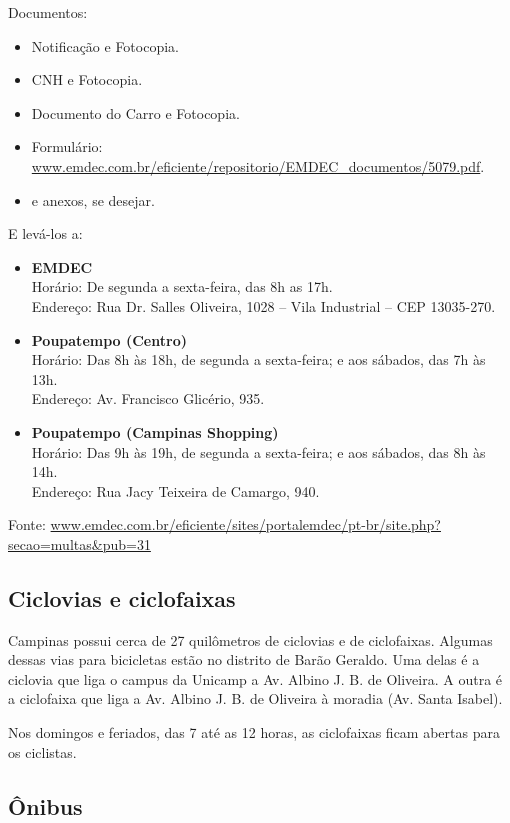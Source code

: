 Documentos:
\begin{itemize}
    \item  Notificação e Fotocopia.
    \item  CNH e Fotocopia.
    \item  Documento do Carro e Fotocopia.
    \item  Formulário: \url{www.emdec.com.br/eficiente/repositorio/EMDEC_documentos/5079.pdf}.
    \item  e anexos, se desejar.
\end{itemize}

E levá-los a:
\begin{itemize}
    \item   \textbf{EMDEC}
        \\Horário: De segunda a sexta-feira, das 8h as 17h.
        \\Endereço: Rua Dr. Salles Oliveira, 1028 -- Vila Industrial -- CEP 13035-270.
    \item   \textbf{Poupatempo (Centro)}
        \\Horário: Das 8h às 18h, de segunda a sexta-feira; e aos sábados, das 7h às 13h.
        \\Endereço: Av. Francisco Glicério, 935.
    \item   \textbf{Poupatempo (Campinas Shopping)}
        \\Horário: Das 9h às 19h, de segunda a sexta-feira; e aos sábados, das 8h às 14h.
        \\Endereço: Rua Jacy Teixeira de Camargo, 940.
\end{itemize}

Fonte: \url{www.emdec.com.br/eficiente/sites/portalemdec/pt-br/site.php?secao=multas&pub=31}

\subsection{Ciclovias e ciclofaixas}

Campinas possui cerca de 27 quilômetros de ciclovias e de ciclofaixas. Algumas dessas vias para 
bicicletas estão no distrito de Barão Geraldo. Uma delas é a ciclovia que liga o campus da Unicamp 
a Av. Albino J. B. de Oliveira. A outra é a ciclofaixa que liga a Av. Albino J. B. de Oliveira 
à moradia (Av. Santa Isabel).

Nos domingos e feriados, das 7 até as 12 horas, as ciclofaixas ficam abertas para os ciclistas.

\subsection{Ônibus}

